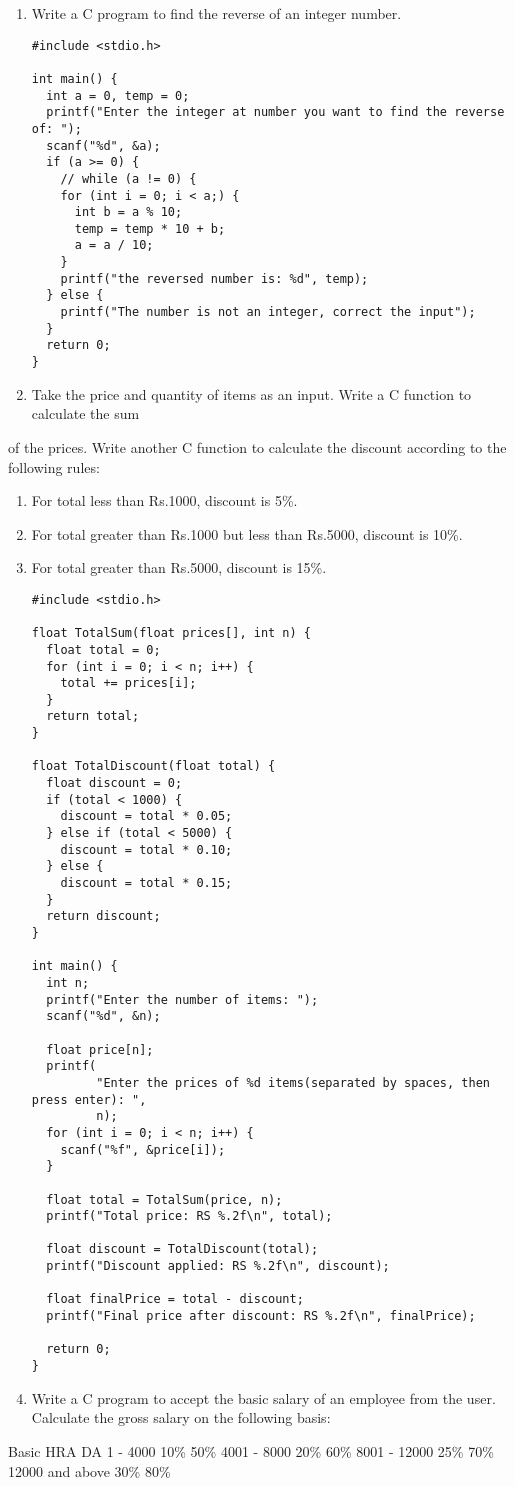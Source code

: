 \documentclass[11pt]{article}
\begin{document}
\begin{enumerate}
\item Write a C program to find the reverse of an integer number. 

\begin{verbatim}
#include <stdio.h>

int main() {
  int a = 0, temp = 0;
  printf("Enter the integer at number you want to find the reverse of: ");
  scanf("%d", &a);
  if (a >= 0) {
    // while (a != 0) {
    for (int i = 0; i < a;) {
      int b = a % 10;
      temp = temp * 10 + b;
      a = a / 10;
    }
    printf("the reversed number is: %d", temp);
  } else {
    printf("The number is not an integer, correct the input");
  }
  return 0;
}
\end{verbatim}

\item Take the price and quantity of items as an input. Write a C function to calculate the sum
\end{enumerate}
of the prices. Write another C function to calculate the discount according to the
following rules:
\begin{enumerate}
\item For total less than Rs.1000, discount is 5\%.
\item For total greater than Rs.1000 but less than Rs.5000, discount is 10\%.
\item For total greater than Rs.5000, discount is 15\%.

\begin{verbatim}
#include <stdio.h>

float TotalSum(float prices[], int n) {
  float total = 0;
  for (int i = 0; i < n; i++) {
    total += prices[i];
  }
  return total;
}

float TotalDiscount(float total) {
  float discount = 0;
  if (total < 1000) {
    discount = total * 0.05;
  } else if (total < 5000) {
    discount = total * 0.10;
  } else {
    discount = total * 0.15;
  }
  return discount;
}

int main() {
  int n;
  printf("Enter the number of items: ");
  scanf("%d", &n);

  float price[n];
  printf(
         "Enter the prices of %d items(separated by spaces, then press enter): ",
         n);
  for (int i = 0; i < n; i++) {
    scanf("%f", &price[i]);
  }

  float total = TotalSum(price, n);
  printf("Total price: RS %.2f\n", total);

  float discount = TotalDiscount(total);
  printf("Discount applied: RS %.2f\n", discount);

  float finalPrice = total - discount;
  printf("Final price after discount: RS %.2f\n", finalPrice);

  return 0;
}
\end{verbatim}

\item Write a C program to accept the basic salary of an employee from the user. Calculate the gross salary on the following basis:
\end{enumerate}
Basic HRA DA
1 - 4000 10\% 50\%
4001 - 8000 20\% 60\%
8001 - 12000 25\% 70\%
12000 and above 30\% 80\%
\end{document}
